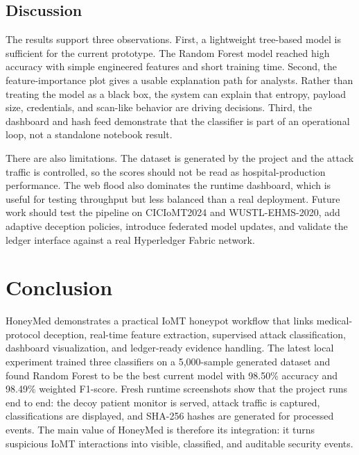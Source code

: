 \documentclass[conference, a4paper]{IEEEtran}
\begin{document}
\subsection{Discussion}
The results support three observations. First, a lightweight tree-based model is sufficient for the current prototype. The Random Forest model reached high accuracy with simple engineered features and short training time. Second, the feature-importance plot gives a usable explanation path for analysts. Rather than treating the model as a black box, the system can explain that entropy, payload size, credentials, and scan-like behavior are driving decisions. Third, the dashboard and hash feed demonstrate that the classifier is part of an operational loop, not a standalone notebook result.

There are also limitations. The dataset is generated by the project and the attack traffic is controlled, so the scores should not be read as hospital-production performance. The web flood also dominates the runtime dashboard, which is useful for testing throughput but less balanced than a real deployment. Future work should test the pipeline on CICIoMT2024 and WUSTL-EHMS-2020, add adaptive deception policies, introduce federated model updates, and validate the ledger interface against a real Hyperledger Fabric network.

\section{Conclusion}
HoneyMed demonstrates a practical IoMT honeypot workflow that links medical-protocol deception, real-time feature extraction, supervised attack classification, dashboard visualization, and ledger-ready evidence handling. The latest local experiment trained three classifiers on a 5,000-sample generated dataset and found Random Forest to be the best current model with 98.50\% accuracy and 98.49\% weighted F1-score. Fresh runtime screenshots show that the project runs end to end: the decoy patient monitor is served, attack traffic is captured, classifications are displayed, and SHA-256 hashes are generated for processed events. The main value of HoneyMed is therefore its integration: it turns suspicious IoMT interactions into visible, classified, and auditable security events.
\end{document}
